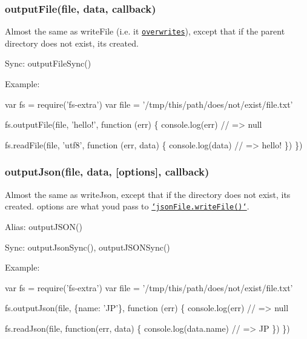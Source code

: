 \subsubsection*{output\+File(file, data, callback)}

Almost the same as {\ttfamily write\+File} (i.\+e. it \href{http://pages.citebite.com/v2o5n8l2f5reb}{\tt overwrites}), except that if the parent directory does not exist, it\textquotesingle{}s created.

Sync\+: {\ttfamily output\+File\+Sync()}

Example\+:


\begin{DoxyCode}
var fs = require(\textcolor{stringliteral}{'fs-extra'})
var file = '/tmp/this/path/does/not/exist/file.txt'

fs.outputFile(file, 'hello!', function (err) \{
  console.log(err) \textcolor{comment}{// => null}

  fs.readFile(file, \textcolor{stringliteral}{'utf8'}, \textcolor{keyword}{function} (err, data) \{
    console.log(data) \textcolor{comment}{// => hello!}
  \})
\})
\end{DoxyCode}


\subsubsection*{output\+Json(file, data, \mbox{[}options\mbox{]}, callback)}

Almost the same as {\ttfamily write\+Json}, except that if the directory does not exist, it\textquotesingle{}s created. {\ttfamily options} are what you\textquotesingle{}d pass to \href{https://github.com/jprichardson/node-jsonfile#writefilefilename-options-callback}{\tt `json\+File.write\+File()`}.

Alias\+: {\ttfamily output\+J\+S\+O\+N()}

Sync\+: {\ttfamily output\+Json\+Sync()}, {\ttfamily output\+J\+S\+O\+N\+Sync()}

Example\+:


\begin{DoxyCode}
var fs = require(\textcolor{stringliteral}{'fs-extra'})
var file = '/tmp/this/path/does/not/exist/file.txt'

fs.outputJson(file, \{name: \textcolor{stringliteral}{'JP'}\}, \textcolor{keyword}{function} (err) \{
  console.log(err) \textcolor{comment}{// => null}

  fs.readJson(file, \textcolor{keyword}{function}(err, data) \{
    console.log(data.name) \textcolor{comment}{// => JP}
  \})
\})
\end{DoxyCode}


